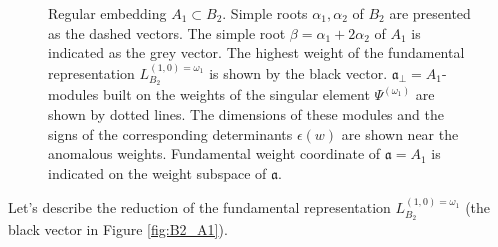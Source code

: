 \documentclass[12pt]{iopart}
\theoremstyle{definition}
\begin{document}
\begin{figure}[p]
  \noindent{}
  \caption{Regular embedding $A_1\subset B_2$. Simple roots $\alpha_1, \alpha_2$ of $B_2$ are presented as the dashed vectors.
    The simple root $\beta = \alpha_1+2\alpha_2$ of $A_1$ is indicated as the grey vector.
    The highest weight of the fundamental representation $L^{(1,0)=\omega_1}_{B_2}$ is shown by the black vector.  $\mathfrak{a}_{\bot}=A_1$-modules built on the weights of the singular element $\Psi^{(\omega_1)}$ are shown by dotted lines. The dimensions of these modules and the signs of the corresponding determinants $\epsilon(w)$ are shown near the anomalous weights. Fundamental weight coordinate of $\mathfrak{a}=A_1$ is indicated on the weight subspace of $\mathfrak{a}$. }
  \label{fig:B2_A1_2}
\end{figure}

Let's describe the reduction of the fundamental representation $L^{(1,0)=\omega_1}_{B_2}$ (the black vector in Figure \ref{fig:B2_A1}).
\end{document}
